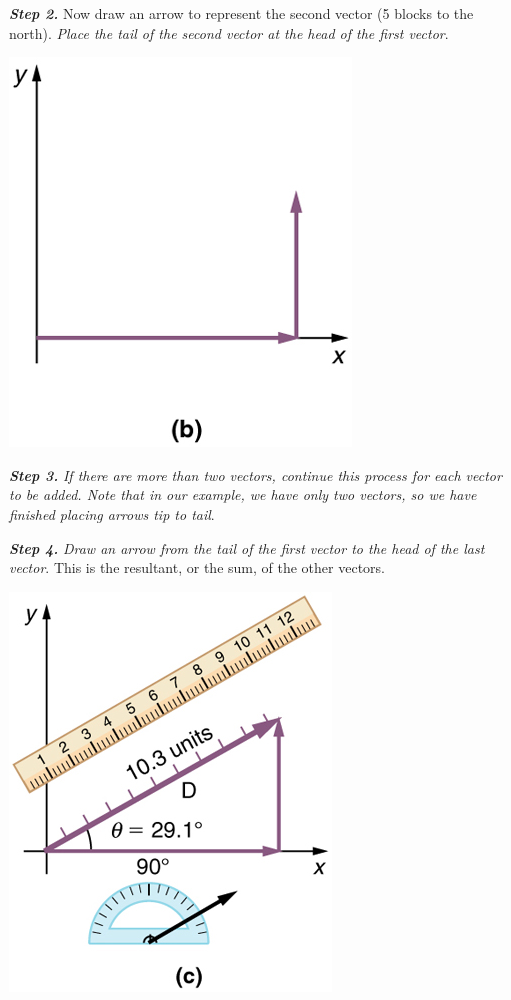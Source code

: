 \documentclass[
]{book}
\begin{document}
\textbf{\emph{Step 2.}} Now draw an arrow to represent the second vector (5 blocks
to the north). \emph{Place the tail of the second vector at the head of the
first vector}.

\includegraphics{images/Figure_03_02_05a.jpg}

\textbf{\emph{Step 3.}} \emph{If there are more than two vectors, continue this process
for each vector to be added. Note that in our example, we have only two
vectors, so we have finished placing arrows tip to tail}.

\textbf{\emph{Step 4.}} \emph{Draw an arrow from the tail of the first vector to the
head of the last vector}. This is the
\protect\hypertarget{import-auto-id1165296311722}{}{resultant}, or the sum,
of the other vectors.

\includegraphics{images/Figure_03_02_06a.jpg}
\end{document}
